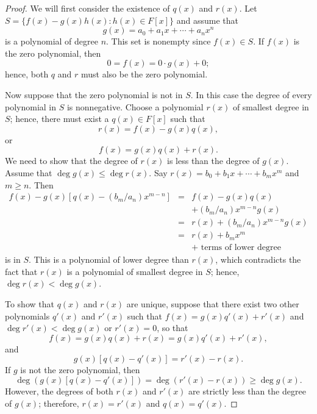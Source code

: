  
\begin{proof}
We will first consider the existence of $q(x)$ and $r(x)$. Let $S = \{
f(x) - g(x) h(x)   :  h(x) \in F[x]  \}$ and assume that 
$$
g(x) = a_0 + a_1 x + \cdots + a_n x^n
$$
is a polynomial of degree $n$. This set is nonempty since $f(x) \in
S$. If $f(x)$ is the zero polynomial, then 
$$
0 = f(x) = 0 \cdot g(x) + 0;
$$
hence, both $q$ and $r$ must also be the zero polynomial. 
 
 
Now suppose that the zero polynomial is not in $S$. In this case the
degree of every polynomial in $S$ is nonnegative.  Choose a polynomial
$r(x)$ of smallest degree in $S$; hence, there must exist a $q(x) \in
F[x]$ such that  
$$
r(x) = f(x) - g(x) q(x),
$$
or 
$$
f(x) = g(x ) q(x) + r(x).
$$
We need to show that the degree of $r(x)$ is less than the degree of
$g(x)$. Assume that $\deg g(x) \leq \deg r(x)$. Say $r(x) = b_0 + b_1 
x + \cdots + b_m x^m$ and $m \geq n$. Then
\begin{eqnarray*}
f(x) - g(x) [ q(x) - (b_m/a_n) x^{m-n} ]
& = & f(x) - g(x) q(x) \\
&   & +  (b_m/a_n) x^{m-n} g(x)  \\
& = & r(x) + (b_m/a_n) x^{m-n} g(x) \\
& = & r(x) + b_m x^m \\
&   & + \mbox{ terms of lower degree}
\end{eqnarray*}
is in $S$. This is a polynomial of lower degree than $r(x)$, which
contradicts the fact that $r(x)$ is a polynomial of smallest degree
in $S$; hence, $\deg r(x) < \deg g(x)$.
 
 
To show that  $q(x)$ and $r(x)$ are unique, suppose that there exist
two other polynomials $q'(x)$ and $r'(x)$ such that $f(x) = g(x) q'(x)
+ r'(x)$ and $\deg r'(x) < \deg g(x)$ or $r'(x) = 0$, so that
$$
f(x) = g(x) q(x) + r(x) = g(x) q'(x) + r'(x),
$$
and
$$
g(x) [q(x) - q'(x) ] = r'(x) - r(x).
$$
If $g$ is not the zero polynomial, then 
$$
\deg( g(x) [q(x) - q'(x) ] )= \deg( r'(x) - r(x) ) \geq \deg g(x).
$$
However, the degrees of both $r(x)$ and $r'(x)$ are strictly less than
the degree of $g(x)$; therefore, $r(x) = r'(x)$ and $q(x) = q'(x)$.
\end{proof}
 

